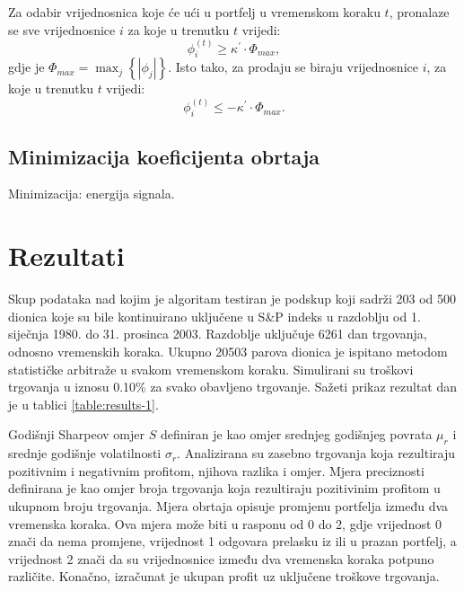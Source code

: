 \documentclass[lmodern, utf8, diplomski, numeric]{fer}
\newcommand{\q}{\left}
\newcommand{\w}{\right}
\begin{document}
  Za odabir vrijednosnica koje će ući u portfelj u vremenskom koraku $t$, pronalaze se sve vrijednosnice $i$ za koje u trenutku $t$ vrijedi:
  \begin{equation*}
  \phi_i^{\q(t\w)} \ge \kappa^\prime \cdot \Phi_\mathit{max},
  \end{equation*}
  gdje je $\Phi_\mathit{max} = \max_j \q\{ \q\lvert \phi_j \w\rvert \w\}$.
  Isto tako, za prodaju se biraju vrijednosnice $i$, za koje u trenutku $t$ vrijedi:
  \begin{equation*}
  \phi_i^{\q(t\w)} \le -\kappa^\prime \cdot \Phi_\mathit{max}.
  \end{equation*}
  
  \section{Minimizacija koeficijenta obrtaja} 
  Minimizacija: energija signala.
  
  \chapter{Rezultati}
  Skup podataka nad kojim je algoritam testiran je podskup koji sadrži 203 od 500 dionica koje su bile kontinuirano uključene u S\&P indeks u razdoblju od 1. siječnja 1980. do 31. prosinca 2003.
  Razdoblje uključuje 6261 dan trgovanja, odnosno vremenskih koraka.
  Ukupno 20503 parova dionica je ispitano metodom statističke arbitraže u svakom vremenskom koraku.
  Simulirani su troškovi trgovanja u iznosu 0.10\% za svako obavljeno trgovanje.
  Sažeti prikaz rezultat dan je u tablici \ref{table:results-1}.
  
  Godišnji Sharpeov omjer $S$ definiran je kao omjer srednjeg godišnjeg povrata $\mu_r$ i srednje godišnje volatilnosti $\sigma_r$.
  Analizirana su zasebno trgovanja koja rezultiraju pozitivnim i negativnim profitom, njihova razlika i omjer.
  Mjera preciznosti definirana je kao omjer broja trgovanja koja rezultiraju pozitivinim profitom u ukupnom broju trgovanja.
  Mjera obrtaja  opisuje promjenu portfelja između dva vremenska koraka.
  Ova mjera može biti u rasponu od 0 do 2, gdje vrijednost 0 znači da nema promjene, vrijednost 1 odgovara prelasku iz ili u prazan portfelj, a vrijednost 2 znači da su vrijednosnice između dva vremenska koraka potpuno različite.
  Konačno, izračunat je ukupan profit uz uključene troškove trgovanja.
  
\end{document}
